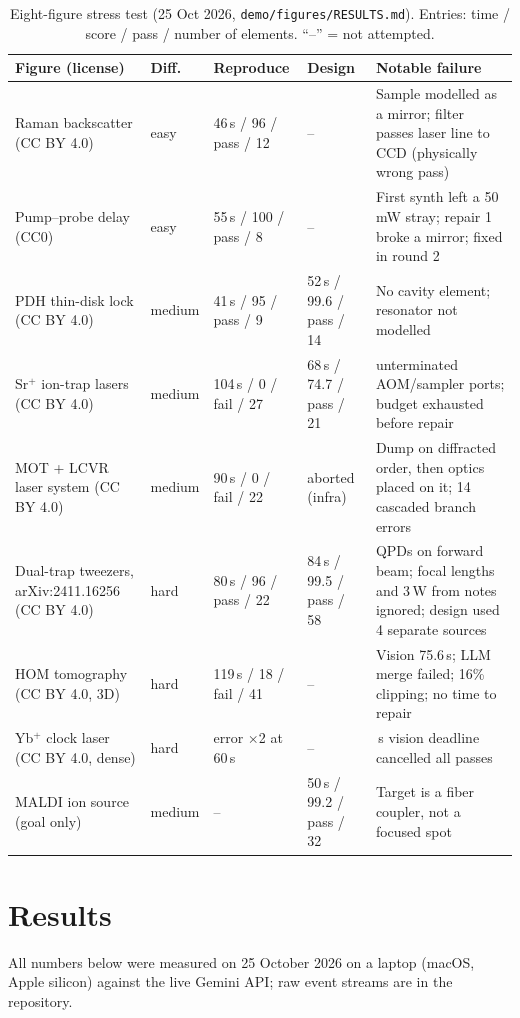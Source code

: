 \documentclass[10pt,twocolumn,letterpaper]{article}
\newcommand{\code}[1]{\texttt{\small #1}}
\begin{document}
\begin{table}[t]
\centering\footnotesize\setlength{\tabcolsep}{4pt}
\caption{Eight-figure stress test (25 Oct 2026, \code{demo/figures/RESULTS.md}). Entries: time / score / pass / number of elements. ``--'' = not attempted.}
\label{tab:benchmark}
\begin{tabularx}{\textwidth}{@{}>{\raggedright\arraybackslash}p{3.3cm}p{1.1cm}p{2.7cm}p{2.7cm}>{\raggedright\arraybackslash}X@{}}
\toprule
Figure (license) & Diff. & Reproduce & Design & Notable failure \\
\midrule
Raman backscatter (CC BY 4.0) & easy & 46\,s / 96 / pass / 12 & -- & Sample modelled as a mirror; filter passes laser line to CCD (physically wrong pass) \\
Pump--probe delay (CC0) & easy & 55\,s / 100 / pass / 8 & -- & First synth left a 50\,mW stray; repair 1 broke a mirror; fixed in round 2 \\
PDH thin-disk lock (CC BY 4.0) & medium & 41\,s / 95 / pass / 9 & 52\,s / 99.6 / pass / 14 & No cavity element; resonator not modelled \\
Sr$^+$ ion-trap lasers (CC BY 4.0) & medium & 104\,s / 0 / fail / 27 & 68\,s / 74.7 / pass / 21 & 9 unterminated AOM/sampler ports; budget exhausted before repair \\
MOT + LCVR laser system (CC BY 4.0) & medium & 90\,s / 0 / fail / 22 & aborted (infra) & Dump on diffracted order, then optics placed on it; 14 cascaded branch errors \\
Dual-trap tweezers, arXiv:2411.16256 (CC BY 4.0) & hard & 80\,s / 96 / pass / 22 & 84\,s / 99.5 / pass / 58 & QPDs on forward beam; focal lengths and 3\,W from notes ignored; design used 4 separate sources \\
HOM tomography (CC BY 4.0, 3D) & hard & 119\,s / 18 / fail / 41 & -- & Vision 75.6\,s; LLM merge failed; 16\% clipping; no time to repair \\
Yb$^+$ clock laser (CC BY 4.0, dense) & hard & error $\times$2 at 60\,s & -- & 60\,s vision deadline cancelled all passes \\
MALDI ion source (goal only) & medium & -- & 50\,s / 99.2 / pass / 32 & Target is a fiber coupler, not a focused spot \\
\bottomrule
\end{tabularx}
\end{table}

\section{Results}
\label{sec:results}
All numbers below were measured on 25 October 2026 on a laptop (macOS, Apple silicon) against the live Gemini API; raw event streams are in the repository.
\end{document}
